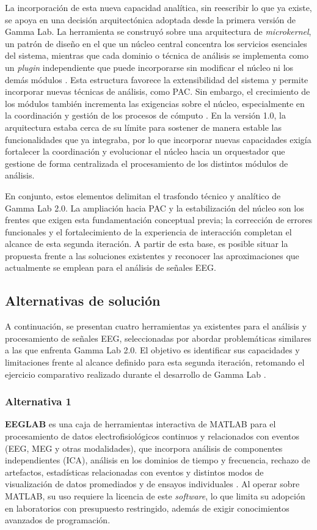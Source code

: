 \documentclass[12pt,letterpaper,oneside]{article}
\begin{document}
La incorporación de esta nueva capacidad analítica, sin reescribir lo que ya existe, se apoya en una decisión arquitectónica adoptada desde la primera versión de Gamma Lab. La herramienta se construyó sobre una arquitectura de \textit{microkernel}, un patrón de diseño en el que un núcleo central concentra los servicios esenciales del sistema, mientras que cada dominio o técnica de análisis se implementa como un \textit{plugin} independiente que puede incorporarse sin modificar el núcleo ni los demás módulos \cite{richards2022}. Esta estructura favorece la extensibilidad del sistema y permite incorporar nuevas técnicas de análisis, como PAC. Sin embargo, el crecimiento de los módulos también incrementa las exigencias sobre el núcleo, especialmente en la coordinación y gestión de los procesos de cómputo \cite{richards2022}. En la versión 1.0, la arquitectura estaba cerca de su límite para sostener de manera estable las funcionalidades que ya integraba, por lo que incorporar nuevas capacidades exigía fortalecer la coordinación y evolucionar el núcleo hacia un orquestador que gestione de forma centralizada el procesamiento de los distintos módulos de análisis.

En conjunto, estos elementos delimitan el trasfondo técnico y analítico de Gamma Lab 2.0. La ampliación hacia PAC y la estabilización del núcleo son los frentes que exigen esta fundamentación conceptual previa; la corrección de errores funcionales y el fortalecimiento de la experiencia de interacción completan el alcance de esta segunda iteración. A partir de esta base, es posible situar la propuesta frente a las soluciones existentes y reconocer las aproximaciones que actualmente se emplean para el análisis de señales EEG.


\subsection{Alternativas de solución}

A continuación, se presentan cuatro herramientas ya existentes para el análisis y procesamiento de señales EEG, seleccionadas por abordar problemáticas similares a las que enfrenta Gamma Lab 2.0. El objetivo es identificar sus capacidades y limitaciones frente al alcance definido para esta segunda iteración, retomando el ejercicio comparativo realizado durante el desarrollo de Gamma Lab \cite{asencio2025}.


\subsubsection{Alternativa 1}
\textbf{EEGLAB} es una caja de herramientas interactiva de MATLAB para el procesamiento de datos electrofisiológicos continuos y relacionados con eventos (EEG, MEG y otras modalidades), que incorpora análisis de componentes independientes (ICA), análisis en los dominios de tiempo y frecuencia, rechazo de artefactos, estadísticas relacionadas con eventos y distintos modos de visualización de datos promediados y de ensayos individuales \cite{eeglab}. Al operar sobre MATLAB, su uso requiere la licencia de este \textit{software}, lo que limita su adopción en laboratorios con presupuesto restringido, además de exigir conocimientos avanzados de programación.
\end{document}
